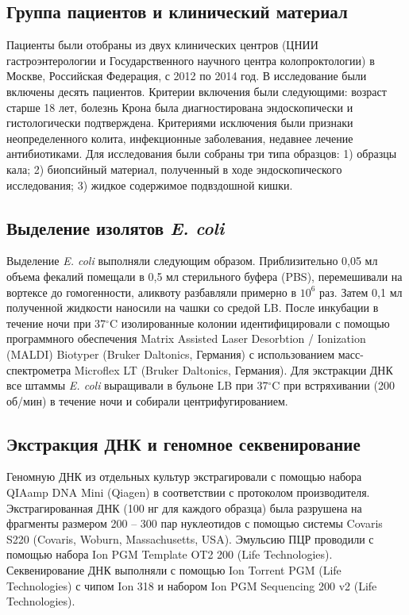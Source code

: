 \subsection{Группа пациентов и клинический материал}
Пациенты были отобраны из двух клинических центров (ЦНИИ гастроэнтерологии и Государственного научного центра колопроктологии) в Москве, Российская Федерация, с 2012 по 2014 год. В исследование были включены десять пациентов. Критерии включения были следующими: возраст старше 18 лет, болезнь Крона была диагностирована эндоскопически и гистологически подтверждена. Критериями исключения были признаки неопределенного колита, инфекционные заболевания, недавнее лечение антибиотиками. 
Для исследования были собраны три типа образцов: 1) образцы кала; 2) биопсийный материал, полученный в ходе эндоскопического исследования; 3) жидкое содержимое подвздошной кишки.

\subsection{Выделение изолятов \textit{E. coli}}

Выделение \textit{E. coli} выполняли следующим образом. Приблизительно 0,05 мл объема фекалий помещали в 0,5 мл стерильного буфера (PBS), перемешивали на вортексе до гомогенности, аликвоту разбавляли примерно в $10^6$ раз. Затем 0,1 мл полученной жидкости наносили на чашки со средой LB. После инкубации в течение ночи при 37$^\circ$C изолированные колонии идентифицировали с помощью программного обеспечения Matrix Assisted Laser Desorbtion / Ionization (MALDI) Biotyper (Bruker Daltonics, Германия) с использованием масс-спектрометра Microflex LT (Bruker Daltonics, Германия). Для экстракции ДНК все штаммы \textit{E. coli} выращивали в бульоне LB при 37$^\circ$C при встряхивании (200 об/мин) в течение ночи и собирали центрифугированием.

\subsection{Экстракция ДНК и геномное секвенирование}

Геномную ДНК из отдельных культур экстрагировали с помощью набора QIAamp DNA Mini (Qiagen) в соответствии с протоколом производителя. Экстрагированная ДНК (100 нг для каждого образца) была разрушена на фрагменты размером 200 – 300 пар нуклеотидов с помощью системы Covaris S220 (Covaris, Woburn, Massachusetts, USA). Эмульсию ПЦР проводили с помощью набора Ion PGM Template OT2 200 (Life Technologies). Секвенирование ДНК выполняли с помощью Ion Torrent PGM (Life Technologies) с чипом Ion 318 и набором Ion PGM Sequencing 200 v2 (Life Technologies). 

